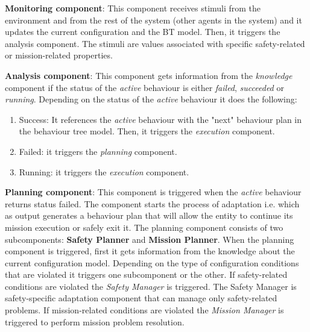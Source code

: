 \documentclass[journal]{IEEEtran}
\theoremstyle{definition}
\begin{document}
\textbf{Monitoring component}: This component receives stimuli from the environment and from the rest of the system (other agents in the system) and it updates the current configuration and the BT model. Then, it triggers the analysis component.
The stimuli are values associated with specific safety-related or mission-related properties. 





\textbf{Analysis component}: This component gets information from the \textit{knowledge} component if the status of the \textit{active} behaviour is either \textit{failed}, \textit{succeeded} or \textit{running}. 
Depending on the status of the \textit{active} behaviour it does the following:
\begin{enumerate}
\item  Success: 
It references the \textit{active} behaviour with the "next" behaviour plan in the behaviour tree model. Then, it triggers the \textit{execution} component.
\item Failed:  it triggers the \textit{planning} component.
\item Running: it triggers the \textit{execution} component.
\end{enumerate}
 
\textbf{Planning component}: This component is triggered when the \textit{active} behaviour returns status failed. %
The component starts the process of adaptation i.e. which as output generates a behaviour plan that will allow the entity to continue its mission execution or safely exit it.
The  planning component consists of two subcomponents: \textbf{Safety Planner} and \textbf{Mission Planner}.  When the planning component is triggered, first it gets information from the knowledge about the current configuration model.
Depending on the type of configuration conditions that are violated it triggers one subcomponent or the other. If safety-related conditions are violated the \textit{Safety Manager}  is triggered. The Safety Manager is safety-specific adaptation component that can manage only safety-related problems. If mission-related conditions are violated the \textit{Mission Manager} is triggered to perform mission problem resolution.
\end{document}
